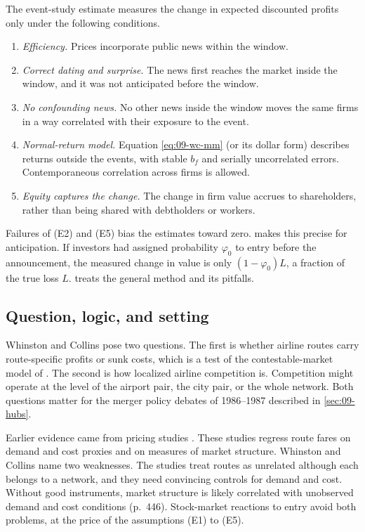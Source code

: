 The event-study estimate measures the change in expected discounted profits only under the following
conditions.
\begin{enumerate}[label=(E\arabic*)]
\item \emph{Efficiency.} Prices incorporate public news within the window.
\item \emph{Correct dating and surprise.} The news first reaches the market inside the window, and it
was not anticipated before the window.
\item \emph{No confounding news.} No other news inside the window moves the same firms in a way
correlated with their exposure to the event.
\item \emph{Normal-return model.} Equation \eqref{eq:09-wc-mm} (or its dollar form) describes returns
outside the events, with stable $b_f$ and serially uncorrelated errors. Contemporaneous correlation
across firms is allowed.
\item \emph{Equity captures the change.} The change in firm value accrues to shareholders, rather than
being shared with debtholders or workers.
\end{enumerate}
Failures of (E2) and (E5) bias the estimates toward zero.  makes this
precise for anticipation. If investors had assigned probability $\varphi_0$ to entry before the
announcement, the measured change in value is only $(1-\varphi_0)L$, a fraction of the true loss $L$.
 treats the general method and its pitfalls.

\subsection{Question, logic, and setting}\label{sec:09-wc-question}

Whinston and Collins pose two questions. The first is whether airline routes carry route-specific
profits or sunk costs, which is a test of the contestable-market model of
\citet{BaumolPanzarWillig1982}. The second is how localized airline competition is. Competition might
operate at the level of the airport pair, the city pair, or the whole network. Both questions matter
for the merger policy debates of 1986--1987 described in \cref{sec:09-hubs}.

Earlier evidence came from pricing studies \citep{GrahamKaplanSibley1983,CallKeeler1985,
BaileyGrahamKaplan1985,MorrisonWinston1987,Borenstein1989}. These studies regress route fares on
demand and cost proxies and on measures of market structure. Whinston and Collins name two weaknesses.
The studies treat routes as unrelated although each belongs to a network, and they need convincing
controls for demand and cost. Without good instruments, market structure is likely correlated with
unobserved demand and cost conditions (p.~446). Stock-market reactions to entry avoid both
problems, at the price of the assumptions (E1) to (E5).

